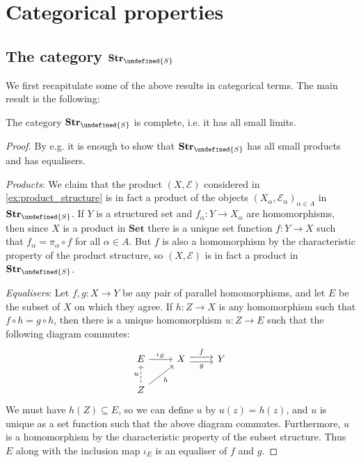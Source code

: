 \documentclass[article, a4paper, 11pt, oneside]{memoir}
\let\mathfrak\undefined
\numberwithin{equation}{chapter}
\newcommand{\calE}{\mathcal{E}}
\newcommand{\strucS}{\mathfrak{S}}
\newcommand{\ncat}[1]{\mathbf{#1}} %
\newcommand{\catSet}{\ncat{Set}} %
\newcommand{\catStruc}[1]{\ncat{Str}_{#1}} %
\newcommand{\catStrucS}{\catStruc{\strucS}} %
\begin{document}
\section{Categorical properties} \label{sec:structure_categorical}

\subsection{The category $\catStrucS$}

We first recapitulate some of the above results in categorical terms. The main result is the following:

\begin{theorem}[Completeness of $\catStrucS$]
    The category $\catStrucS$ is complete, i.e. it has all small limits.
\end{theorem}

\begin{proof}
    By e.g. \textcite[Theorem~60]{smithcategory} it is enough to show that $\catStrucS$ has all small products and has equalisers.

    \emph{Products}: We claim that the product $(X, \calE)$ considered in \cref{ex:product_structure} is in fact a product of the objects $(X_\alpha, \calE_\alpha)_{\alpha \in A}$ in $\catStrucS$. If $Y$ is a structured set and $f_\alpha \colon Y \to X_\alpha$ are homomorphisms, then since $X$ is a product in $\catSet$ there is a unique set function $f \colon Y \to X$ such that $f_\alpha = \pi_\alpha \circ f$ for all $\alpha \in A$. But $f$ is also a homomorphism by the characteristic property of the product structure, so $(X, \calE)$ is in fact a product in $\catStrucS$.

    \emph{Equalisers}: Let $f,g \colon X \to Y$ be any pair of parallel homomorphisms, and let $E$ be the subset of $X$ on which they agree. If $h \colon Z \to X$ is any homomorphism such that $f \circ h = g \circ h$, then there is a unique homomorphism $u \colon Z \to E$ such that the following diagram commutes:
    \begin{equation*}
        \begin{tikzcd}
            E
                \ar[r, "\iota_E"]
            & X
                \ar[r, shift left, "f"]
                \ar[r, shift right, "g", swap]
            & Y \\
            Z
                \ar[u, dashed, "u"]
                \ar[ur, "h", swap]
        \end{tikzcd}
    \end{equation*}
    We must have $h(Z) \subseteq E$, so we can define $u$ by $u(z) = h(z)$, and $u$ is unique as a set function such that the above diagram commutes. Furthermore, $u$ is a homomorphism by the characteristic property of the subset structure. Thus $E$ along with the inclusion map $\iota_E$ is an equaliser of $f$ and $g$.
\end{proof}
\end{document}
